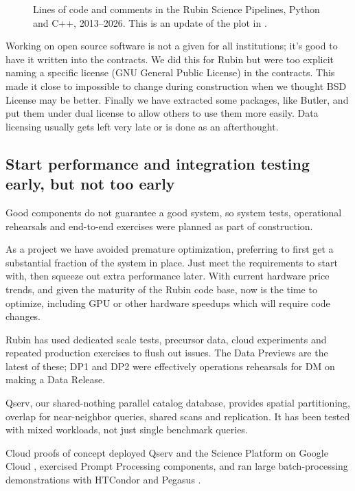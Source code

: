 \begin{figure}
\caption{Lines of code and comments in the Rubin Science Pipelines, Python and C++, 2013--2026.
This is an update of the plot in \citet{2018SPIE10707E..09J}.}
\label{fig:loc}
\end{figure}

Working on open source software is not a given for all institutions; it's good to have it written into the contracts.
We did this for Rubin but were too explicit naming a specific license (GNU General Public License) in the contracts.
This made it close to impossible to change during construction when we thought BSD License may be better.
Finally we have extracted some packages, like Butler, and put them under dual license to allow others to use them more easily.
Data licensing usually gets left very late or is done as an afterthought.


\subsection{Start performance and integration testing early, but not too early}
\label{sec:performance}

Good components do not guarantee a good system, so system tests, operational rehearsals and end-to-end exercises were planned as part of construction.

As a project we have avoided premature optimization, preferring to first get a substantial fraction of the system in place.
Just meet the requirements to start with, then squeeze out extra performance later.
With current hardware price trends, and given the maturity of the Rubin code base, now is the time to optimize, including GPU or other hardware speedups which will require code changes.

Rubin has used dedicated scale tests, precursor data, cloud experiments and repeated production exercises to flush out issues.
The Data Previews are the latest of these; DP1 and DP2 \citep{2026AJ....171..360V,RTN-115} were effectively operations rehearsals for DM on making a Data Release.

Qserv, our shared-nothing parallel catalog database, provides spatial partitioning, overlap for near-neighbor queries, shared scans and replication.
It has been tested with mixed workloads, not just single benchmark queries.

Cloud proofs of concept deployed Qserv and the Science Platform on Google Cloud \citep{2024ASPC..535..227O}, exercised Prompt Processing components, and ran large batch-processing demonstrations with HTCondor and Pegasus \citep{2019AAS...23324505B}.


